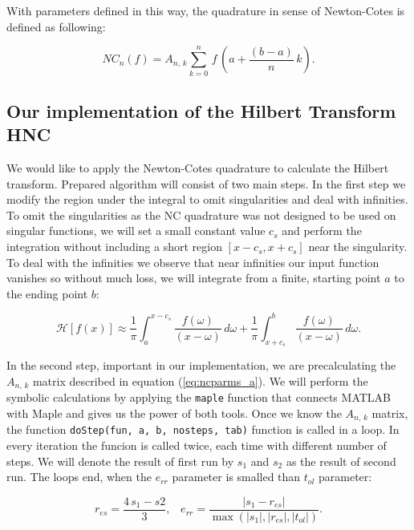 \documentclass[12pt,twoside,a4paper]{article}
\numberwithin{equation}{subsection}
\numberwithin{figure}{subsection}
\begin{document}
With parameters defined in this way, the quadrature in sense of Newton-Cotes is defined as following:

\begin{equation} \label{eq:nc_mainequation}
   NC_{n} (f) = { A_{n, \, k} } \sum_{ k = 0 }^{n} \, f \, (a + \frac {(b - a)} {n} \, k) . 
\end{equation}

\subsection{Our implementation of the Hilbert Transform HNC}  \label{chap:nc_hilbert_transform}

We would like to apply the Newton-Cotes quadrature to calculate the Hilbert transform. Prepared algorithm will consist of two main steps. In the first step we modify the region under the integral to omit singularities and deal with infinities. To omit the singularities as the NC quadrature was not designed to be used on singular functions, we will set a small constant value $c_s$ and perform the integration without including a short region $[x - c_s, x + c_s]$ near the singularity. To deal with the infinities we observe that near infinities our input function vanishes so without much loss, we will integrate from a finite, starting point $a$ to the ending point $b$:

\begin{equation}
	\mathcal{H}[f(x)] \approx \frac{1}{\pi} \int_{ a }^{ x - c_s } \frac{ f(\omega) }{ (x - \omega) } \, d\omega 
                         +  \frac{1}{\pi} \int_{ x + c_s }^{ b } \frac{ f(\omega) }{ (x - \omega) } \, d\omega .
\end{equation} 

In the second step, important in our implementation, we are pre\-calculating the $A_{n, \, k}$ matrix described in equation (\ref{eq:ncparms_a}). We will perform the symbolic calculations by applying the \texttt{maple} function that connects MATLAB with Maple and gives us the power of both tools. Once we know the $A_{n, \, k}$ matrix, the function \texttt{doStep(fun, a, b, nosteps, tab)} function is called in a loop. In every iteration the funcion is called twice, each time with different number of steps. We will denote the result of first run by $s_1$ and $s_2$ as the result of second run. The loops end, when the $e_{rr}$ parameter is smalled than $t_{ol}$ parameter:

\begin{equation}
  r_{es} = \frac{4 \, s_1 - s2}{3}, \, \ \ \ e_{rr} = \frac{| s_1 - r_{es} |}{\max(|s_1|, |r_{es}|, |t_{ol}|)}.
\end{equation}
\end{document}
